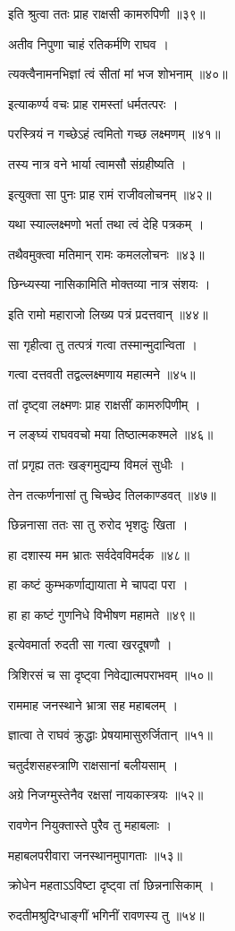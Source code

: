 इति श्रुत्वा ततः प्राह राक्षसी कामरुपिणी ॥३९॥

अतीव निपुणा चाहं रतिकर्मणि राघव ।

त्यक्त्वैनामनभिज्ञां त्वं सीतां मां भज शोभनाम् ॥४०॥

इत्याकर्ण्य वचः प्राह रामस्तां धर्मतत्परः ।

परस्त्रियं न गच्छेऽहं त्वमितो गच्छ लक्ष्मणम् ॥४१॥

तस्य नात्र वने भार्या त्वामसौ संग्रहीष्यति ।

इत्युक्ता सा पुनः प्राह रामं राजीवलोचनम् ॥४२॥

यथा स्याल्लक्ष्मणो भर्ता तथा त्वं देहि पत्रकम् ।

तथैवमुक्त्वा मतिमान् रामः कमललोचनः ॥४३॥

छिन्ध्यस्या नासिकामिति मोक्तव्या नात्र संशयः ।

इति रामो महाराजो लिख्य पत्रं प्रदत्तवान् ॥४४॥

सा गृहीत्वा तु तत्पत्रं गत्वा तस्मान्मुदान्विता ।

गत्वा दत्तवती तद्वल्लक्ष्मणाय महात्मने ॥४५॥

तां दृष्ट्वा लक्ष्मणः प्राह राक्षसीं कामरुपिणीम् ।

न लङ्घ्यं राघववचो मया तिष्ठात्मकश्मले ॥४६॥

तां प्रगृह्य ततः खङ्गमुद्यम्य विमलं सुधीः ।

तेन तत्कर्णनासां तु चिच्छेद तिलकाण्डवत् ॥४७॥

छिन्ननासा ततः सा तु रुरोद भृशदुः खिता ।

हा दशास्य मम भ्रातः सर्वदेवविमर्दक ॥४८॥

हा कष्टं कुम्भकर्णाद्यायाता मे चापदा परा ।

हा हा कष्टं गुणनिधे विभीषण महामते ॥४९॥

इत्येवमार्ता रुदती सा गत्वा खरदूषणौ ।

त्रिशिरसं च सा दृष्ट्वा निवेद्यात्मपराभवम् ॥५०॥

राममाह जनस्थाने भ्रात्रा सह महाबलम् ।

ज्ञात्वा ते राघवं क्रुद्धाः प्रेषयामासुरुर्जितान् ॥५१॥

चतुर्दशसहस्त्राणि राक्षसानां बलीयसाम् ।

अग्रे निजग्मुस्तेनैव रक्षसां नायकास्त्रयः ॥५२॥

रावणेन नियुक्तास्ते पुरैव तु महाबलाः ।

महाबलपरीवारा जनस्थानमुपागताः ॥५३॥

क्रोधेन महताऽऽविष्टा दृष्ट्वा तां छिन्ननासिकाम् ।

रुदतीमश्रुदिग्धाङ्गीं भगिनीं रावणस्य तु ॥५४॥

